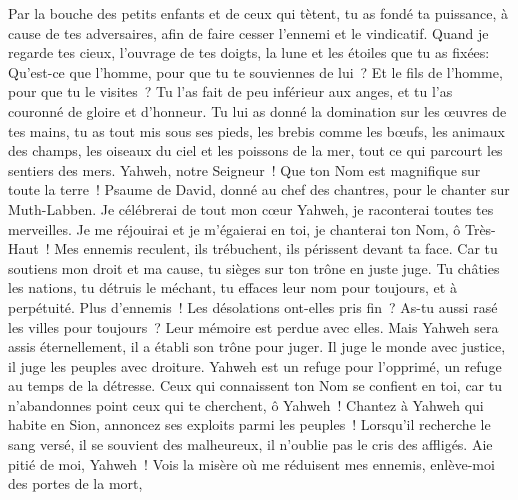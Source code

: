 \begin{multicols}{2}
Par la bouche des petits enfants et de ceux qui tètent, tu as fondé ta puissance, à cause de tes adversaires, afin de faire cesser l'ennemi et le vindicatif.
Quand je regarde tes cieux, l'ouvrage de tes doigts, la lune et les étoiles que tu as fixées:
Qu'est-ce que l'homme, pour que tu te souviennes de lui~? Et le fils de l'homme, pour que tu le visites~?
Tu l'as fait de peu inférieur aux anges, et tu l'as couronné de gloire et d'honneur.
Tu lui as donné la domination sur les œuvres de tes mains, tu as tout mis sous ses pieds,
les brebis comme les bœufs, les animaux des champs,
les oiseaux du ciel et les poissons de la mer, tout ce qui parcourt les sentiers des mers.
Yahweh, notre Seigneur~! Que ton Nom est magnifique sur toute la terre~!
\VerseOne{}Psaume de David, donné au chef des chantres, pour le chanter sur Muth-Labben.
Je célébrerai de tout mon cœur Yahweh, je raconterai toutes tes merveilles.
Je me réjouirai et je m'égaierai en toi, je chanterai ton Nom, ô Très-Haut~!
Mes ennemis reculent, ils trébuchent, ils périssent devant ta face.
Car tu soutiens mon droit et ma cause, tu sièges sur ton trône en juste juge.
Tu châties les nations, tu détruis le méchant, tu effaces leur nom pour toujours, et à perpétuité.
Plus d'ennemis~! Les désolations ont-elles pris fin~? As-tu aussi rasé les villes pour toujours~? Leur mémoire est perdue avec elles.
Mais Yahweh sera assis éternellement, il a établi son trône pour juger.
Il juge le monde avec justice, il juge les peuples avec droiture.
Yahweh est un refuge pour l'opprimé, un refuge au temps de la détresse.
Ceux qui connaissent ton Nom se confient en toi, car tu n'abandonnes point ceux qui te cherchent, ô Yahweh~!
Chantez à Yahweh qui habite en Sion, annoncez ses exploits parmi les peuples~!
Lorsqu'il recherche le sang versé, il se souvient des malheureux, il n'oublie pas le cris des affligés.
Aie pitié de moi, Yahweh~! Vois la misère où me réduisent mes ennemis, enlève-moi des portes de la mort,

\end{multicols}

